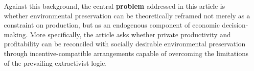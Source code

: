 





Against this background, the central \textbf{problem} addressed in this article is whether environmental preservation can be theoretically reframed not merely as a constraint on production, but as an endogenous component of economic decision-making. More specifically, the article asks whether private productivity and profitability can be reconciled with socially desirable environmental preservation through incentive-compatible arrangements capable of overcoming the limitations of the prevailing extractivist logic.

